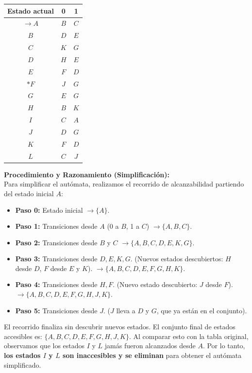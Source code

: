 \documentclass[12pt]{article}
\begin{document}
\begin{center}
\begin{tabular}{|c|c|c|}
\hline
\textbf{Estado actual} & \textbf{0} & \textbf{1} \\
\hline
$\rightarrow A$ & $B$ & $C$ \\
\hline
$B$ & $D$ & $E$ \\
\hline
$C$ & $K$ & $G$ \\
\hline
$D$ & $H$ & $E$ \\
\hline
$E$ & $F$ & $D$ \\
\hline
$*F$ & $J$ & $G$ \\
\hline
$G$ & $E$ & $G$ \\
\hline
$H$ & $B$ & $K$ \\
\hline
$I$ & $C$ & $A$ \\
\hline
$J$ & $D$ & $G$ \\
\hline
$K$ & $F$ & $D$ \\
\hline
$L$ & $C$ & $J$ \\
\hline
\end{tabular}
\end{center}

\vspace{0.5cm}

\textbf{Procedimiento y Razonamiento (Simplificación):} \\
Para simplificar el autómata, realizamos el recorrido de alcanzabilidad partiendo del estado inicial $A$:
\begin{itemize}
    \item \textbf{Paso 0:} Estado inicial $\rightarrow \{A\}$.
    \item \textbf{Paso 1:} Transiciones desde $A$ (0 a $B$, 1 a $C$) $\rightarrow \{A, B, C\}$.
    \item \textbf{Paso 2:} Transiciones desde $B$ y $C$ $\rightarrow \{A, B, C, D, E, K, G\}$.
    \item \textbf{Paso 3:} Transiciones desde $D, E, K, G$. (Nuevos estados descubiertos: $H$ desde $D$, $F$ desde $E$ y $K$). $\rightarrow \{A, B, C, D, E, F, G, H, K\}$.
    \item \textbf{Paso 4:} Transiciones desde $H, F$. (Nuevo estado descubierto: $J$ desde $F$). $\rightarrow \{A, B, C, D, E, F, G, H, J, K\}$.
    \item \textbf{Paso 5:} Transiciones desde $J$. ($J$ lleva a $D$ y $G$, que ya están en el conjunto). 
\end{itemize}
El recorrido finaliza sin descubrir nuevos estados. El conjunto final de estados accesibles es: $\{A, B, C, D, E, F, G, H, J, K\}$.
Al comparar esto con la tabla original, observamos que los estados $I$ y $L$ jamás fueron alcanzados desde $A$. Por lo tanto, \textbf{los estados $I$ y $L$ son inaccesibles y se eliminan} para obtener el autómata simplificado.
\end{document}
